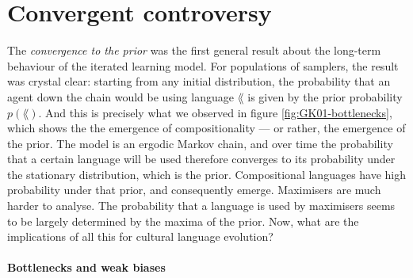 \documentclass{../src/bcthesispart}
\begin{document}
\section{Convergent controversy}


The \emph{convergence to the prior} was the first general result about the long-term behaviour of the iterated learning model.
For populations of samplers, the result was crystal clear: starting from any initial distribution, the probability that an agent down the chain would be using language $\lang$ is given by the prior probability $p(\lang)$.
And this is precisely what we observed in figure \ref{fig:GK01-bottlenecks}, which shows the the emergence of compositionality — or rather, the emergence of the prior.
The model is an ergodic Markov chain, and over time the probability that a certain language will be used therefore converges to its probability under the stationary distribution, which is the prior.
Compositional languages have high probability under that prior, and consequently emerge.
Maximisers are much harder to analyse.
The probability that a language is used by maximisers seems to be largely determined by the maxima of the prior.
Now, what are the implications of all this for cultural language evolution?





\paragraph{Bottlenecks and weak biases}
\end{document}
